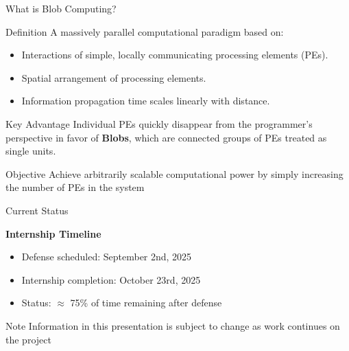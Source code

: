 \documentclass{beamer}
\begin{document}
\begin{frame}{What is Blob Computing?}
    \begin{block}{Definition}
        A massively parallel computational paradigm based on:
        \begin{itemize}
            \item Interactions of simple, locally communicating processing elements (PEs).
            \item Spatial arrangement of processing elements.
            \item Information propagation time scales linearly with distance.
        \end{itemize}
    \end{block}
    
    \pause

    \begin{block}{Key Advantage}
        Individual PEs quickly disappear from the programmer's perspective in favor of \textbf{Blobs}, which are connected groups of PEs treated as single units.
    \end{block}

    \pause
    
    \begin{block}{Objective}
        Achieve arbitrarily scalable computational power by simply increasing the number of PEs in the system
    \end{block}
\end{frame}

\begin{frame}{Current Status}
    \begin{center}
        \Large \textbf{Internship Timeline}
    \end{center}
    
    \vspace{1cm}
    
    \begin{itemize}
        \item Defense scheduled: September 2nd, 2025
        \item Internship completion: October 23rd, 2025
        \item Status: $\approx$ 75\% of time remaining after defense
    \end{itemize}
    
    \vspace{1cm}
    
    \begin{alertblock}{Note}
        Information in this presentation is subject to change as work continues on the project
    \end{alertblock}
\end{frame}
\end{document}
